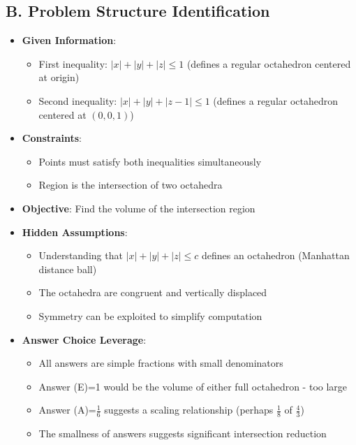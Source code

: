 \documentclass[11pt]{article}
\begin{document}
\begin{problemconfigbox}
\subsection*{B. Problem Structure Identification}
\begin{itemize}[leftmargin=*]
    \item \textbf{Given Information}: 
    \begin{itemize}
        \item First inequality: $|x|+|y|+|z|\le1$ (defines a regular octahedron centered at origin)
        \item Second inequality: $|x|+|y|+|z-1|\le1$ (defines a regular octahedron centered at $(0,0,1)$)
    \end{itemize}
    \item \textbf{Constraints}: 
    \begin{itemize}
        \item Points must satisfy both inequalities simultaneously
        \item Region is the intersection of two octahedra
    \end{itemize}
    \item \textbf{Objective}: Find the volume of the intersection region
    \item \textbf{Hidden Assumptions}: 
    \begin{itemize}
        \item Understanding that $|x|+|y|+|z|\le c$ defines an octahedron (Manhattan distance ball)
        \item The octahedra are congruent and vertically displaced
        \item Symmetry can be exploited to simplify computation
    \end{itemize}
    \item \textbf{Answer Choice Leverage}: 
    \begin{itemize}
        \item All answers are simple fractions with small denominators
        \item Answer (E)=1 would be the volume of either full octahedron - too large
        \item Answer (A)=$\frac{1}{6}$ suggests a scaling relationship (perhaps $\frac{1}{8}$ of $\frac{4}{3}$)
        \item The smallness of answers suggests significant intersection reduction
    \end{itemize}
\end{itemize}


\end{problemconfigbox}
\end{document}
